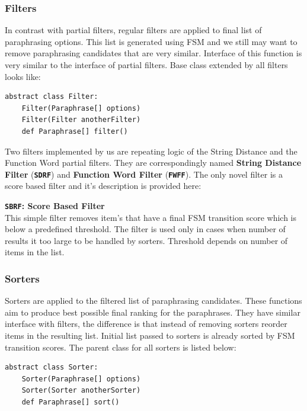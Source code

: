 \subsubsection{Filters}

In contrast with partial filters, regular filters are applied to final list of paraphrasing options. This list is generated using FSM and we still may want to remove paraphrasing candidates that are very similar. Interface of this function is very similar to the interface of partial filters. Base class extended by all filters looks like:

\begin{verbatim}
abstract class Filter:
    Filter(Paraphrase[] options)
    Filter(Filter anotherFilter)
    def Paraphrase[] filter()
\end{verbatim}

Two filters implemented by us are repeating logic of the String Distance and the Function Word partial filters. They are correspondingly named \textbf{String Distance Filter} (\textbf{\texttt{SDRF}}) and \textbf{Function Word Filter} (\texttt{\textbf{FWFF}}). The only novel filter is a score based filter and it's description is provided here:


\begin{flushleft}

\textbf{\texttt{SBRF}: \textbf{Score Based Filter}} \\
This simple filter removes item's that have a final FSM transition score which is below a predefined threshold. 
The filter is used only in cases when number of results it too large to be handled by sorters. Threshold depends on number of items in the list.
\bigskip

\end{flushleft}

\subsubsection{Sorters}

Sorters are applied to the filtered list of paraphrasing candidates. These functions aim to produce best possible final ranking for the paraphrases. They have similar interface with filters, the difference is that instead of removing sorters reorder items in the resulting list. Initial list passed to sorters is already sorted by FSM transition scores. The parent class for all sorters is listed below:

\begin{verbatim}
abstract class Sorter:
    Sorter(Paraphrase[] options)
    Sorter(Sorter anotherSorter)
    def Paraphrase[] sort()
\end{verbatim}


